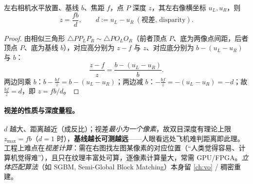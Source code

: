 \begin{theorem}[双目深度]\label{thm:stereo}
左右相机水平放置、基线 $b$、焦距 $f$，点 $P$ 深度 $z$，其左右像横坐标 $u_L,u_R$，则
\begin{equation}
  z=\frac{fb}{d},\qquad d:=u_L-u_R\ (\text{视差,\ disparity}).
  \label{eq:stereo}
\end{equation}
\end{theorem}
\begin{proof}
由相似三角形 $\triangle PP_LP_R\sim\triangle PO_LO_R$（前者顶点 $P$、底为两像点间距，后者顶点 $P$、底为基线 $b$），对应高分别为 $z-f$ 与 $z$、对应底分别为 $b-(u_L-u_R)$ 与 $b$：
\[
  \frac{z-f}{z}=\frac{b-(u_L-u_R)}{b}.
\]
两边同乘 $b$：$b-\tfrac{bf}{z}=b-(u_L-u_R)$；两边减 $b$：$-\tfrac{bf}{z}=-(u_L-u_R)=-d$；故 $\tfrac{bf}{z}=d$，即 $z=fb/d$。
\end{proof}

\paragraph{视差的性质与深度量程。}
$d$ 越大、距离越近（成反比）\cite{gaoxiang2019slam14}；视差\emph{最小为一个像素}，故双目深度有理论上限 $z_{\max}=fb$（$d=1$ 时），\textbf{基线越长可测越远}——人眼看远处飞机难判距离即此理。工程上难点在\emph{视差计算}：需在右图找左图某像素的对应位置（“人类觉得容易、计算机觉得难”），且只在纹理丰富处可算，逐像素计算量大，常需 GPU/FPGA。\emph{立体匹配算法}（如 SGBM, Semi-Global Block Matching）本身留 \cref{ch:vo} / 稠密重建。

